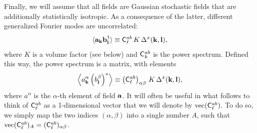 \documentclass[a4paper,11pt]{article}
\begin{document}
      Finally, we will assume that all fields are Gaussian stochastic fields that are additionally statistically isotropic. As a consequence of the latter, different generalized Fourier modes are uncorrelated:
      \begin{equation}\label{eq:iso}
        \langle {\bf a}_{\bf k}{\bf b}^\dag_{\bf l}\rangle\equiv {\sf C}^{ab}_\ell\,K\,\Delta^x({\bf k},{\bf l}),
      \end{equation}
      where $K$ is a volume factor (see below) and ${\sf C}^{ab}_k$ is the power spectrum. Defined this way, the power spectrum is a matrix, with elements
      \begin{equation}
        \left\langle a^\alpha_{\bf k}\left(b^\beta_{\bf l}\right)^*\right\rangle\equiv \left({\sf C}^{ab}_\ell\right)_{\alpha\beta}\,K\,\Delta^x({\bf k},{\bf l}),
      \end{equation}
      where $a^\alpha$ is the $\alpha$-th element of field ${\bf a}$. It will often be useful in what follows to think of ${\sf C}^{ab}_\ell$ as a 1-dimensional vector that we will denote by ${\rm vec}({\sf C}^{ab}_\ell)$. To do so, we simply map the two indices $(\alpha,\beta)$ into a single number $A$, such that ${\rm vec}({\sf C}^{ab}_\ell)_A = ({\sf C}^{ab}_\ell)_{\alpha\beta}$.
    
\end{document}
